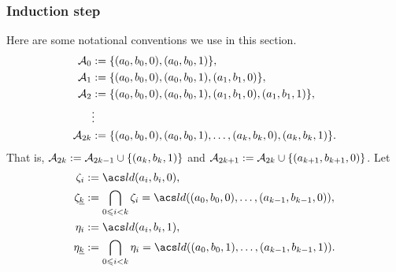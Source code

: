 \begin{comment}
\noindent \underline{\textbf{Subroutine \ld-2'}}\\[4pt]
To compute an \ld term operation for
$((a_0,b_0,1), (a_1, b_1, 0))$, obviously this is symmetric to
the situation handled in Subroutine LD2 and so the general algorithm
is the same.  Nonetheless, we include a listing of the computational 
steps required so that later we can easily refer to this special case 
of the general algorithm.
\begin{enumerate}[{\bf 1}]
\item Compute $\delta_1=\com{\thetaone}$;
\item form $C_1= \{b_0\}\times a_1/\delta_1 \leq \alg{A}\times\alg{A}$;
\item compute
      $S_1=\Sg^{\alg{A}\times \alg{A}} ((a_0,a_1),(a_0,b_1),(b_0,b_1))$;
\item find a term operation $t$ of $\alg{A}$ satisfying
\[t^{\alg{A}\times\alg{A}}((a_0,a_1),(a_0,b_1),(b_0,b_1)) =
 (t^{\alg{A}}(a_0,a_0,b_0), t^{\alg{A}}(a_1,b_1,b_1)) \in C_1 \cap S_1.\]
\end{enumerate}
Then $t$ is an \ld term for
$((a_0, b_0, 1), (a_1, b_1, 0))$.
\end{comment}


\subsubsection{Induction step}
\label{sec:induct}
Here are some notational conventions we use in this section.
\begin{align*}
\mathcal{A}_0 &:= \{(a_0, b_0, 0), (a_0, b_0, 1)\},\\
\mathcal{A}_1 &:= \{(a_0, b_0, 0), (a_0, b_0, 1), (a_1,b_1,0)\},\\
\mathcal{A}_2 &:= \{(a_0, b_0, 0), (a_0, b_0, 1), (a_1,b_1,0), (a_1,b_1,1)\},\\
&\vdots\\
\mathcal{A}_{2k} &:= \{(a_0, b_0, 0), (a_0, b_0, 1), \dots, (a_k,b_k,0), (a_k,b_k,1)\}.
\end{align*}
That is, 
$\mathcal{A}_{2k} := \mathcal{A}_{2k-1} \cup \{(a_k,b_k,1)\}$ and
$\mathcal{A}_{2k+1} := \mathcal{A}_{2k} \cup \{(a_{k+1},b_{k+1},0)\}$.
Let
\begin{align*}
  \zeta_i &:= \ld(a_i, b_i, 0), \\%
  \zeta_{\kk} &:= \bigcap_{0\leq i < k}\zeta_i 
  =\ld ((a_0, b_0, 0), \dots, (a_{k-1}, b_{k-1}, 0)),\\
\eta_i &:= \ld(a_i, b_i, 1),\\
  \eta_{\kk} &:= \bigcap_{0\leq i < k}\eta_i
  =\ld ((a_0, b_0, 1) , \dots, (a_{k-1}, b_{k-1}, 1)).
\end{align*}

